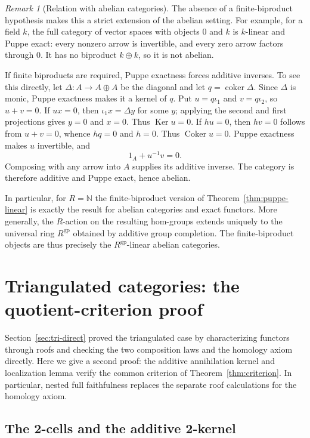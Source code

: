 \documentclass[11pt,reqno,a4paper]{amsart}
\theoremstyle{definition}
\theoremstyle{remark}
\newtheorem{remark}[theorem]{Remark}
\newcommand{\0}{\mathbf{0}}
\renewcommand{\1}{\mathbf{1}}
\DeclareMathOperator{\Ker}{Ker}
\DeclareMathOperator{\Coker}{Coker}
\begin{document}
\begin{remark}[Relation with abelian categories]\label{rem:puppe-linear-abelian}
The absence of a finite-biproduct hypothesis makes this a
strict extension of the abelian setting. For example, for a
field $k$, the full category of vector spaces with objects
$0$ and $k$ is $k$-linear and Puppe exact: every nonzero arrow
is invertible, and every zero arrow factors through $0$.
It has no biproduct $k\oplus k$, so it is not abelian.

If finite biproducts are required, Puppe exactness forces
additive inverses. To see this directly, let
$\Delta:A\to A\oplus A$ be the diagonal and let
$q=\operatorname{coker}\Delta$. Since $\Delta$ is monic,
Puppe exactness makes it a kernel of $q$. Put
$u=q\iota_1$ and $v=q\iota_2$, so $u+v=0$.
If $ux=0$, then $\iota_1x=\Delta y$ for some $y$;
applying the second and first projections gives $y=0$ and
$x=0$. Thus $\Ker u=0$. If $hu=0$, then $hv=0$ follows
from $u+v=0$, whence $hq=0$ and $h=0$. Thus
$\Coker u=0$. Puppe exactness makes $u$ invertible, and
\[
 1_A+u^{-1}v=0.
\]
Composing with any arrow into $A$ supplies its additive
inverse. The category is therefore additive and Puppe exact,
hence abelian.

In particular, for $R=\mathbb N$ the finite-biproduct version
of Theorem~\ref{thm:puppe-linear} is exactly the result for
abelian categories and exact functors. More generally, the
$R$-action on the resulting hom-groups extends uniquely to
the universal ring $R^{\mathrm{gp}}$ obtained by additive
group completion. The finite-biproduct objects are thus
precisely the $R^{\mathrm{gp}}$-linear abelian categories.
\end{remark}

\section{Triangulated categories: the quotient-criterion proof}\label{sec:tri}

Section~\ref{sec:tri-direct} proved the triangulated case by characterizing functors through roofs and checking the two composition laws and the homology axiom directly. Here we give a second proof: the additive annihilation kernel and localization lemma verify the common criterion of Theorem~\ref{thm:criterion}. In particular, nested full faithfulness replaces the separate roof calculations for the homology axiom.

\subsection{The 2-cells and the additive 2-kernel}
\end{document}
